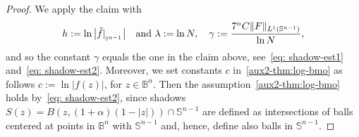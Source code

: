 \documentclass[11pt,a4paper,reqno]{amsart}
\theoremstyle{definition}
\newcommand{\om}{\omega}
\newcommand{\B}{\mathbb{B}^n}
\newcommand{\Rn}{{\mathbb R}^n}
\newcommand{\Sn}{\mathbb{S}^{n-1}}
\newcommand{\blue}{\color{blau}}
\newcounter{komcounter}
\numberwithin{komcounter}{section}
\newcommand{\komT}[1]{{\bf \blue [\refstepcounter{komcounter}\thekomcounter (by T): #1]}}
\begin{document}
\begin{proof}
We apply the claim with 
\[
 h:=\ln \big|{\tilde f}|_{_{\Sn}}\big|\quad \hbox{and }\lambda:=\ln N, \quad \gamma:= \frac{7^n C \|F\|_{L^1(\Sn)}}{\ln N},
\]
and so the constant $\gamma$ equals the one in the claim above, see~\eqref{eq: shadow-est1} and~\eqref{eq: shadow-est2}. Moreover, we set constants $c$ in~\eqref{aux2-thm:log-bmo} as follows $c:=\ln |f(z)|$, for $z\in \B$. Then the assumption~\eqref{aux2-thm:log-bmo} holds by~\eqref{eq: shadow-est2}, since shadows $S(z)=B(z, (1+\alpha)(1-|z|)) \cap \Sn$ are defined as intersections of balls centered at points in $\B$ with $\Sn$ and, hence, define also balls in $\Sn$.
%
%
\end{proof}
\end{document}
